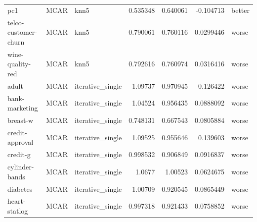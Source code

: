 \begin{table}[ht]
\begin{tabular}{lllrrrl}
 pc1                  & MCAR        & knn5             &                                 0.535348 &                             0.640061 &                    -0.104713   & better               \\
 telco-customer-churn & MCAR        & knn5             &                                 0.790061 &                             0.760116 &                     0.0299446  & worse                \\
 wine-quality-red     & MCAR        & knn5             &                                 0.792616 &                             0.760974 &                     0.0316416  & worse                \\
 adult                & MCAR        & iterative\_single &                                 1.09737  &                             0.970945 &                     0.126422   & worse                \\
 bank-marketing       & MCAR        & iterative\_single &                                 1.04524  &                             0.956435 &                     0.0888092  & worse                \\
 breast-w             & MCAR        & iterative\_single &                                 0.748131 &                             0.667543 &                     0.0805884  & worse                \\
 credit-approval      & MCAR        & iterative\_single &                                 1.09525  &                             0.955646 &                     0.139603   & worse                \\
 credit-g             & MCAR        & iterative\_single &                                 0.998532 &                             0.906849 &                     0.0916837  & worse                \\
 cylinder-bands       & MCAR        & iterative\_single &                                 1.0677   &                             1.00523  &                     0.0624675  & worse                \\
 diabetes             & MCAR        & iterative\_single &                                 1.00709  &                             0.920545 &                     0.0865449  & worse                \\
 heart-statlog        & MCAR        & iterative\_single &                                 0.997318 &                             0.921433 &                     0.0758852  & worse                \\

\end{tabular}
\end{table}
